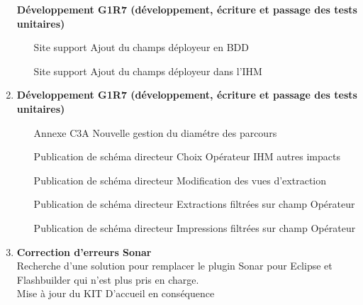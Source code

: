 \begin{enumerate}[label= Semaine \no\textbf{\arabic*.},itemsep=20pt]
\begin{enumerate}[label = Correction \no\arabic*.,align=left]
\end{enumerate}
\textbf{Développement G1R7 (développement, écriture et passage des tests unitaires)}
\begin{enumerate}[label = Développement \no\arabic*.,align=left]
	\item [Site support] Ajout du champs déployeur en BDD
	\item [Site support] Ajout du champs déployeur dans l'IHM
\end{enumerate}
\item
\textbf{Développement G1R7 (développement, écriture et passage des tests unitaires)}
\begin{enumerate}[label = Développement \no\arabic*.,align=left]
	\item [Annexe C3A] Nouvelle gestion du diamétre des parcours
	\item [Publication de schéma directeur] Choix Opérateur IHM autres impacts
	\item [Publication de schéma directeur] Modification des vues d'extraction
	\item [Publication de schéma directeur] Extractions filtrées sur champ Opérateur
	\item [Publication de schéma directeur] Impressions filtrées sur champ Opérateur
\end{enumerate}

\item
\textbf{Correction d'erreurs Sonar}
\\Recherche d'une solution pour remplacer le plugin Sonar pour Eclipse et Flashbuilder qui n'est plus pris en charge.
\\Mise à jour du KIT D'accueil en conséquence


\end{enumerate}

